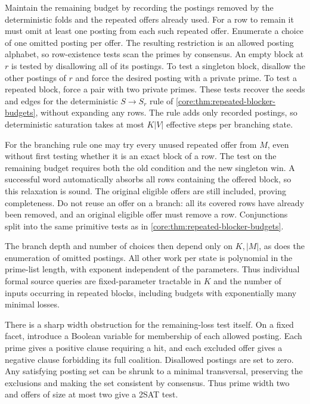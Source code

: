 Maintain the remaining budget by recording the
postings removed by the deterministic folds and
the repeated offers already used. For a row to
remain it must omit at least one posting from
each such repeated offer. Enumerate a choice of
one omitted posting per offer. The resulting
restriction is an allowed posting alphabet, so
row-existence tests scan the primes by consensus.
An empty block at $r$ is tested by disallowing all
of its postings. To test a singleton block,
disallow the other postings of $r$ and force the
desired posting with a private prime. To test a
repeated block, force a pair with two private
primes. These tests recover the seeds and edges
for the deterministic $S\to S_r$ rule of
\cref{core:thm:repeated-blocker-budgets}, without
expanding any rows. The rule adds only recorded
postings, so deterministic saturation takes at
most $K|V|$ effective steps per branching state.

For the branching rule one may try every unused
repeated offer from $M$, even without first
testing whether it is an exact block of a row.
The test on the remaining budget requires both
the old condition and the new singleton win.
A successful word automatically absorbs all rows
containing the offered block, so this relaxation
is sound. The original eligible offers are still
included, proving completeness. Do not reuse an
offer on a branch: all its covered rows have
already been removed, and an original eligible
offer must remove a row. Conjunctions split into
the same primitive tests as in
\cref{core:thm:repeated-blocker-budgets}.

The branch depth and number of choices then
depend only on $K,|M|$, as does the enumeration
of omitted postings. All other work per state
is polynomial in the prime-list length, with
exponent independent of the parameters. Thus
individual formal source queries are fixed-parameter
tractable in $K$ and the number of inputs occurring
in repeated blocks, including budgets with
exponentially many minimal losses.

There is a sharp width obstruction for the
remaining-loss test itself. On a fixed facet,
introduce a Boolean variable for membership of
each allowed posting. Each prime gives a positive
clause requiring a hit, and each excluded offer
gives a negative clause forbidding its full
coalition. Disallowed postings are set to zero.
Any satisfying posting set can be shrunk to a
minimal transversal, preserving the exclusions
and making the set consistent by consensus. Thus
prime width two and offers of size at most two
give a 2SAT test.

